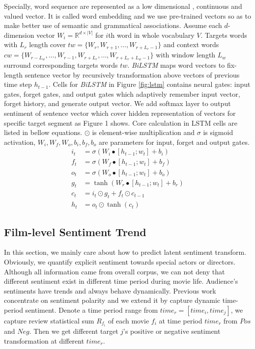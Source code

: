 \par Specially, word sequence are represented as a low dimensional , continuous and valued vector. It is called word embedding and we use pre-trained vectors so as to make better use of semantic and grammatical associations. Assume each $d$-dimension vector $ W_i = \mathbb{R}^{d \times |V|}$ for $i$th word in whole vocabulary $V$. Targets words with $L_r$ length cover $tw = \{W_r, W_{r+1}, \dots, W_{r+L_r-1}\}$ and context words $cw = \{W_{r-L_w}, \dots, W_{r-1}, W_{r+L_r}, \dots, W_{r+L_r+L_w-1}\}$ with window length $L_w$ surround corresponding targets words $tw$. \emph{BiLSTM} maps word vectors to fix-length sentence vector by recursively transformation above vectors of previous time step $h_{t-1}$. Cells for \emph{BiLSTM} in Figure \ref{fig:lstm} contains neural gates: input gates, forget gates, and output gates which adaptively remember input vector, forget history, and generate output vector. We add softmax layer to output sentiment of sentence vector which cover hidden representation of vectors for specific target segment as Figure 1 shows. Core calculation in LSTM cells are listed in bellow equations. $\odot$ is element-wise multiplication and $\sigma$ is sigmoid activation, $W_i, W_f, W_o, b_i, b_f, b_o$ are parameters for input, forget and output gates.
\begin{subequations}
\begin{align}
  i_t &= \sigma(W_i \bullet [h_{t-1};w_t] + b_i)\\
  f_t &= \sigma(W_f \bullet [h_{t-1};w_t] + b_f)\\
  o_t &= \sigma(W_o \bullet [h_{t-1};w_t] + b_o)\\
  g_t &= \tanh(W_r \bullet [h_{t-1};w_t] + b_r)\\
  c_t &= i_t \odot g_t + f_t \odot c_{t-1}\\
  h_t &= o_t \odot \tanh(c_t)
\end{align}
\end{subequations}


\subsection{Film-level Sentiment Trend}
\par In this section, we mainly care about how to predict latent sentiment transform. Obviously, we quantify explicit sentiment towards special actors or directors. Although all information came from overall corpus, we can not deny that different sentiment exist in different time period during movie life. Audience's sentiments have trends and always behave dynamically. Previous work concentrate on sentiment polarity and we extend it by capture dynamic time-period sentiment. Denote a time period range from $time_r = [time_i, time_j]$, we capture review statistical sum $R_{f_i}$ of each movie $f_i$ at time period $time_r$ from $Pos$ and $Neg$. Then we get different target $j$'s positive or negative sentiment transformation at different $time_r$.


